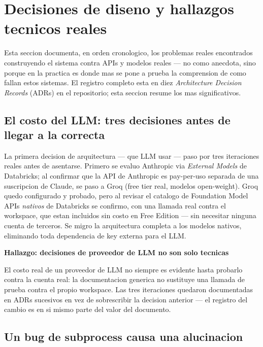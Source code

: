 \documentclass[11pt]{article}
\newenvironment{findingbox}[1]
  {\par\medskip\noindent{\color{warnborder}\rule{\linewidth}{0.7pt}}\par
   \vspace{3pt}\noindent\textbf{\color{warnborder}Hallazgo: #1}\par\smallskip\noindent}
  {\par\vspace{3pt}\noindent{\color{warnborder}\rule{\linewidth}{0.7pt}}\medskip}
\begin{document}
\section{Decisiones de diseno y hallazgos tecnicos reales}

Esta seccion documenta, en orden cronologico, los problemas reales
encontrados construyendo el sistema contra APIs y modelos reales --- no
como anecdota, sino porque en la practica es donde mas se pone a prueba la
comprension de como fallan estos sistemas. El registro completo esta en diez
\emph{Architecture Decision Records} (ADRs) en el repositorio; esta seccion
resume los mas significativos.

\subsection{El costo del LLM: tres decisiones antes de llegar a la correcta}

La primera decision de arquitectura --- que LLM usar --- paso por tres
iteraciones reales antes de asentarse. Primero se evaluo Anthropic via
\emph{External Models} de Databricks; al confirmar que la API de Anthropic
es pay-per-uso separada de una suscripcion de Claude, se paso a Groq (free
tier real, modelos open-weight). Groq quedo configurado y probado, pero al
revisar el catalogo de Foundation Model APIs \emph{nativos} de Databricks se
confirmo, con una llamada real contra el workspace, que estan incluidos sin
costo en Free Edition --- sin necesitar ninguna cuenta de terceros. Se migro
la arquitectura completa a los modelos nativos, eliminando toda dependencia
de key externa para el LLM.

\begin{findingbox}{decisiones de proveedor de LLM no son solo tecnicas}
El costo real de un proveedor de LLM no siempre es evidente hasta probarlo
contra la cuenta real: la documentacion generica no sustituye una llamada de
prueba contra el propio workspace. Las tres iteraciones quedaron documentadas
en ADRs sucesivos en vez de sobrescribir la decision anterior --- el registro
del cambio es en si mismo parte del valor del documento.
\end{findingbox}

\subsection{Un bug de subprocess causa una alucinacion}
\label{sec:hallazgo-windows}
\end{document}
